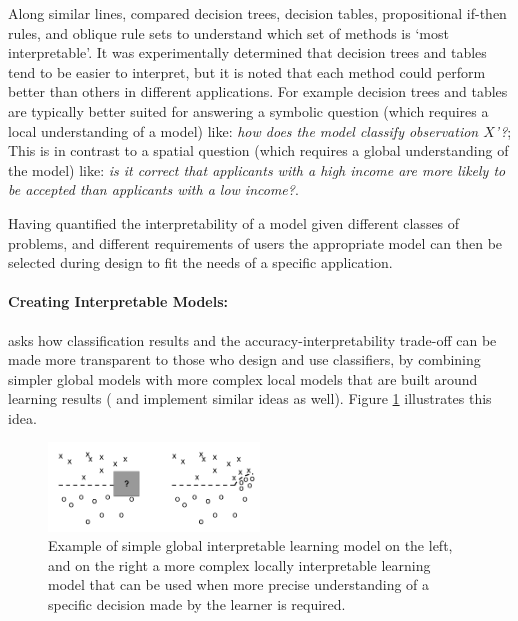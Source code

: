 Along similar lines, \citet{Huysmans2011-th} compared decision trees, decision tables, propositional if-then rules, and oblique rule sets to understand which set of methods is `most interpretable'. It was experimentally determined that decision trees and tables tend to be easier to interpret, but it is noted that each method could perform better than others in different applications. For example decision trees and tables are typically better suited for answering a symbolic question (which requires a local understanding of a model) like: \emph{how does the model classify observation $X$'?}; This is in contrast to a spatial question (which requires a global understanding of the model) like: \emph{is it correct that applicants with a high income are more likely to be accepted than applicants with a low income?}.

Having quantified the interpretability of a model given different classes of problems, and different requirements of users the appropriate model can then be selected during design to fit the needs of a specific application.

\paragraph{Creating Interpretable Models:}
\citet{Ruping2006-xj} asks how classification results and the accuracy-interpretability trade-off can be made more transparent to those who design and use classifiers, by combining simpler global models with more complex local models that are built around learning results (\citet{Otte2013-oo} and \citet{Ribeiro2016-uc} implement similar ideas as well). Figure \ref{fig:ruping} illustrates this idea.

\begin{figure}[htbp]
    \centering
    \includegraphics[width=0.5\textwidth]{Figures/global_local}
    \caption{Example of simple global interpretable learning model on the left, and on the right a more complex locally interpretable learning model that can be used when more precise understanding of a specific decision made by the learner is required. }
    \label{fig:ruping}
\end{figure}

